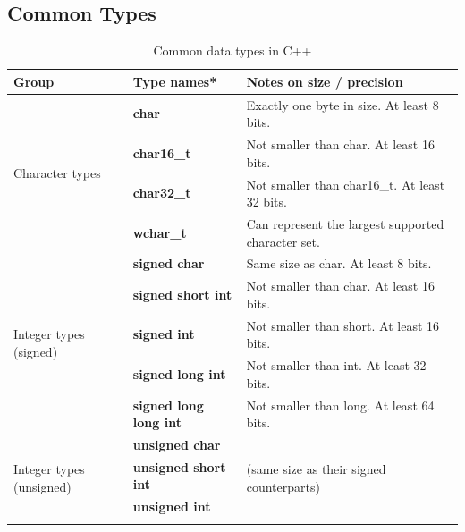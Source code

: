 \documentclass[]{article}
\begin{document}
\subsection{Common Types}
\begin{table}[]
	\centering
	\caption{Common data types in C++}
	\label{tab:data-types}
	\begin{tabular}{@{}lll@{}}
		\toprule
		\textbf{Group}                        & \textbf{Type names*}            & \textbf{Notes on size / precision}                 \\ \midrule
		\multirow{4}{*}{Character types}          & \textbf{char}          & Exactly one byte in size. At least 8 bits.                \\ \cmidrule(l){2-3} 
		& \textbf{char16\_t}              & Not smaller than char. At least 16 bits.           \\ \cmidrule(l){2-3} 
		& \textbf{char32\_t}              & Not smaller than char16\_t. At least 32 bits.      \\ \cmidrule(l){2-3} 
		& \textbf{wchar\_t}               & Can represent the largest supported character set. \\ \midrule
		\multirow{5}{*}{Integer types (signed)}   & \textbf{signed char}   & Same size as char. At least 8 bits.                       \\ \cmidrule(l){2-3} 
		& \textbf{signed short int}       & Not smaller than char. At least 16 bits.           \\ \cmidrule(l){2-3} 
		& \textbf{signed int}             & Not smaller than short. At least 16 bits.          \\ \cmidrule(l){2-3} 
		& \textbf{signed long int}        & Not smaller than int. At least 32 bits.            \\ \cmidrule(l){2-3} 
		& \textbf{signed long long int}   & Not smaller than long. At least 64 bits.           \\ \midrule
		\multirow{5}{*}{Integer types (unsigned)} & \textbf{unsigned char} & \multirow{5}{*}{(same size as their signed counterparts)} \\ \cmidrule(lr){2-2}
		& \textbf{unsigned short int}     &                                                    \\ \cmidrule(lr){2-2}
		& \textbf{unsigned int}           &                                                    \\ \cmidrule(lr){2-2}

\end{tabular}
\end{table}
\end{document}
